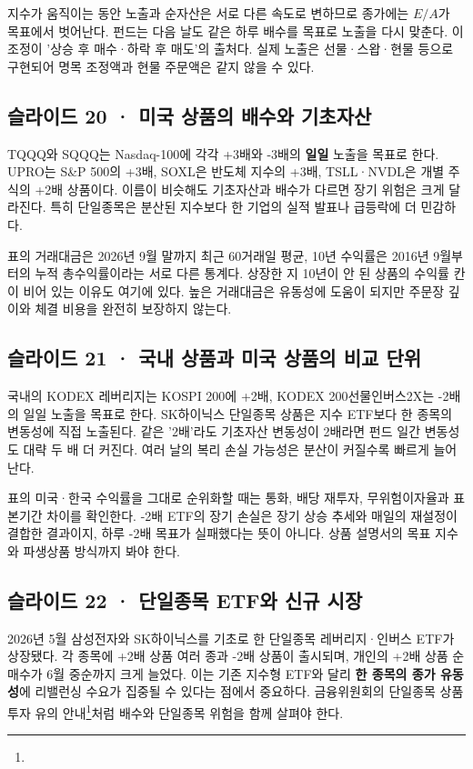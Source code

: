 \documentclass[11pt,a4paper]{article}
\newcommand{\href}[2]{#2\footnote{\texttt{\detokenize{#1}}}}
\begin{document}
지수가 움직이는 동안 노출과 순자산은 서로 다른 속도로 변하므로 종가에는 $E/A$가 목표에서 벗어난다. 펀드는 다음 날도 같은 하루 배수를 목표로 노출을 다시 맞춘다. 이 조정이 '상승 후 매수·하락 후 매도'의 출처다. 실제 노출은 선물·스왑·현물 등으로 구현되어 명목 조정액과 현물 주문액은 같지 않을 수 있다.\par

\subsection{슬라이드 20 · 미국 상품의 배수와 기초자산}
TQQQ와 SQQQ는 Nasdaq-100에 각각 +3배와 -3배의 \textbf{일일} 노출을 목표로 한다. UPRO는 S\&P 500의 +3배, SOXL은 반도체 지수의 +3배, TSLL·NVDL은 개별 주식의 +2배 상품이다. 이름이 비슷해도 기초자산과 배수가 다르면 장기 위험은 크게 달라진다. 특히 단일종목은 분산된 지수보다 한 기업의 실적 발표나 급등락에 더 민감하다.\par

표의 거래대금은 2026년 9월 말까지 최근 60거래일 평균, 10년 수익률은 2016년 9월부터의 누적 총수익률이라는 서로 다른 통계다. 상장한 지 10년이 안 된 상품의 수익률 칸이 비어 있는 이유도 여기에 있다. 높은 거래대금은 유동성에 도움이 되지만 주문장 깊이와 체결 비용을 완전히 보장하지 않는다.\par

\subsection{슬라이드 21 · 국내 상품과 미국 상품의 비교 단위}
국내의 KODEX 레버리지는 KOSPI 200에 +2배, KODEX 200선물인버스2X는 -2배의 일일 노출을 목표로 한다. SK하이닉스 단일종목 상품은 지수 ETF보다 한 종목의 변동성에 직접 노출된다. 같은 '2배'라도 기초자산 변동성이 2배라면 펀드 일간 변동성도 대략 두 배 더 커진다. 여러 날의 복리 손실 가능성은 분산이 커질수록 빠르게 늘어난다.\par

표의 미국·한국 수익률을 그대로 순위화할 때는 통화, 배당 재투자, 무위험이자율과 표본기간 차이를 확인한다. -2배 ETF의 장기 손실은 장기 상승 추세와 매일의 재설정이 결합한 결과이지, 하루 -2배 목표가 실패했다는 뜻이 아니다. 상품 설명서의 목표 지수와 파생상품 방식까지 봐야 한다.\par

\subsection{슬라이드 22 · 단일종목 ETF와 신규 시장}
2026년 5월 삼성전자와 SK하이닉스를 기초로 한 단일종목 레버리지·인버스 ETF가 상장됐다. 각 종목에 +2배 상품 여러 종과 -2배 상품이 출시되며, 개인의 +2배 상품 순매수가 6월 중순까지 크게 늘었다. 이는 기존 지수형 ETF와 달리 \textbf{한 종목의 종가 유동성}에 리밸런싱 수요가 집중될 수 있다는 점에서 중요하다. 금융위원회의 \href{https://www.fsc.go.kr/}{단일종목 상품 투자 유의 안내}처럼 배수와 단일종목 위험을 함께 살펴야 한다.\par
\end{document}
